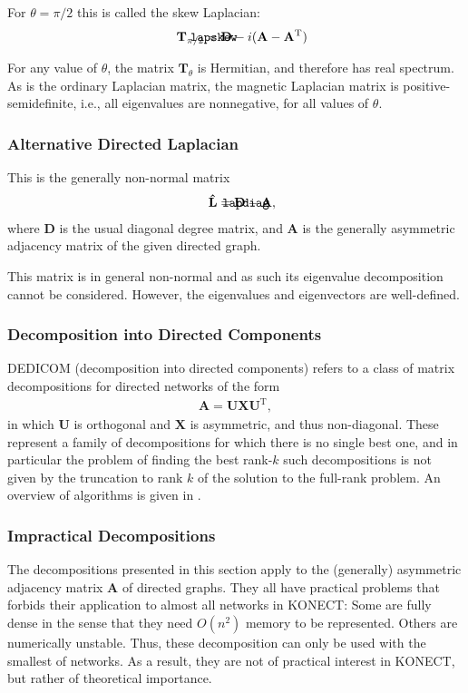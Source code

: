 \documentclass{article}
\def\mathnote#1{%
  \tag*{\rlap{\hspace\marginparsep\smash{\parbox[t]{\marginparwidth}{#1}}}}
}
\begin{document}
For $\theta = \pi/2$ this is called the skew Laplacian:
\begin{align}
  \mathnote{\texttt{lapskew}}
  \mathbf T_{\pi/2} &= \mathbf D - i (\mathbf A - \mathbf A^{\mathrm T})
\end{align}

For any value of $\theta$, the matrix $\mathbf T_{\theta}$ is Hermitian,
and therefore has real spectrum.  As is the ordinary Laplacian matrix,
the magnetic Laplacian matrix is positive-semidefinite, i.e., all
eigenvalues are nonnegative, for all values of $\theta$. 

\subsubsection{Alternative Directed Laplacian}
This is the generally non-normal matrix
\begin{align}
  \mathnote{\texttt{lapdiag}}
  \mathbf{\hat L} &= \mathbf D - \mathbf A, 
\end{align}
where $\mathbf D$ is the usual diagonal degree matrix, and $\mathbf A$
is the generally asymmetric adjacency matrix of the given directed
graph. 

This matrix is in general non-normal and as such its eigenvalue
decomposition cannot be considered.  However, the eigenvalues and
eigenvectors are well-defined. 

\subsubsection{Decomposition into Directed Components}
DEDICOM (decomposition into directed components) refers to a class of
matrix decompositions for directed networks of the form
\begin{align}
  \mathbf A = \mathbf U \mathbf X \mathbf U^{\mathrm T},
\end{align}
in which $\mathbf U$ is orthogonal and $\mathbf X$ is asymmetric, and
thus non-diagonal.  These represent a family of decompositions for which
there is no single best one, and in particular the problem of finding
the best rank-$k$ such decompositions is not given by the truncation to
rank $k$ of the solution to the full-rank problem.  An overview of
algorithms is given in \citep{kunegis:directed-decomposition}. 

\subsubsection{Impractical Decompositions}
The decompositions presented in this section apply to the (generally) asymmetric
adjacency matrix $\mathbf A$ of directed graphs.  
They all have practical problems that forbids their application to
almost all networks in KONECT: 
Some are fully dense in the sense that
they need $O(n^2)$ memory to be represented.  Others are numerically
unstable. 
Thus, these decomposition can only be used with the
smallest of networks.  As a result, they are not of practical interest
in KONECT, but rather of theoretical importance. 
\end{document}
